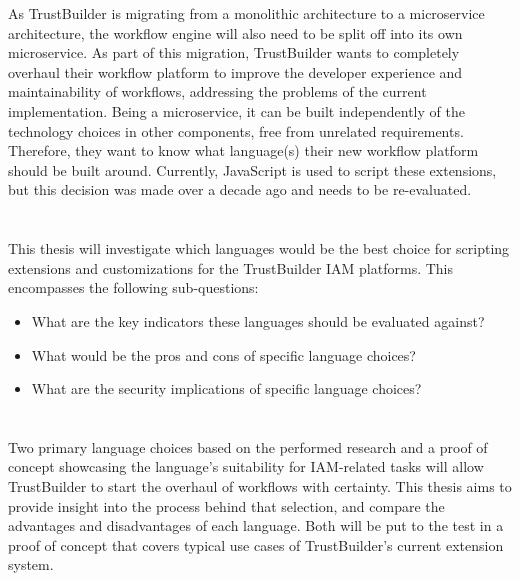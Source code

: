 As TrustBuilder is migrating from a monolithic architecture to a microservice architecture, the workflow engine will also need to be split off into its own microservice. As part of this migration, TrustBuilder wants to completely overhaul their workflow platform to improve the developer experience and maintainability of workflows, addressing the problems of the current implementation. Being a microservice, it can be built independently of the technology choices in other components, free from unrelated requirements. Therefore, they want to know what language(s) their new workflow platform should be built around. Currently, JavaScript is used to script these extensions, but this decision was made over a decade ago and needs to be re-evaluated.

\section{}%
\label{sec:onderzoeksvraag}

This thesis will investigate which languages would be the best choice for scripting extensions and customizations for the TrustBuilder IAM platforms. This encompasses the following sub-questions: 
\begin{itemize}
    \item{What are the key indicators these languages should be evaluated against?}
    \item{What would be the pros and cons of specific language choices?}
    \item{What are the security implications of specific language choices?}
\end{itemize}

\section{}%
\label{sec:onderzoeksdoelstelling}

Two primary language choices based on the performed research and a proof of concept showcasing the language’s suitability for IAM-related tasks will allow TrustBuilder to start the overhaul of workflows with certainty.
This thesis aims to provide insight into the process behind that selection, and compare the advantages and disadvantages of each language. Both will be put to the test in a proof of concept that covers typical use cases of TrustBuilder's current extension system.

